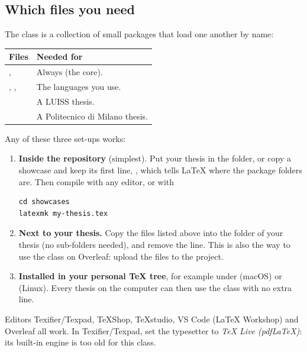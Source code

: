 \documentclass[11pt,a4paper]{article}
\begin{document}
\subsection{Which files you need}

The class is a collection of small packages that load one another by name:

\begin{tabularx}{\textwidth}{@{}l Y@{}}
\toprule
\textbf{Files} & \textbf{Needed for} \\
\midrule
{},  & Always (the core). \\
, ,  & The languages you use. \\
 & A LUISS thesis. \\
 & A Politecnico di Milano thesis. \\
\bottomrule
\end{tabularx}

Any of these three set-ups works:

\begin{enumerate}
  \item \textbf{Inside the repository} (simplest). Put your thesis in the
     folder, or copy a showcase and keep its first line,
    \verb||, which tells \LaTeX{} where the
    package folders are. Then compile with any editor, or with
    \begin{lstlisting}[style=shell]
cd showcases
latexmk my-thesis.tex
    \end{lstlisting}
  \item \textbf{Next to your thesis.} Copy the files listed above into the
    folder of your thesis (no sub-folders needed), and remove the
    \verb|| line. This is also the way to
    use the class on Overleaf: upload the files to the project.
  \item \textbf{Installed in your personal \TeX{} tree}, for example under
     (macOS) or
     (Linux). Every thesis on the
    computer can then use the class with no extra line.
\end{enumerate}

\begin{notebox}{Editors}
Texifier/Texpad, TeXShop, TeXstudio, VS Code (LaTeX Workshop) and Overleaf
all work. In Texifier/Texpad, set the typesetter to \emph{TeX Live
(pdfLaTeX)}: its built-in engine is too old for this class.
\end{notebox}
\end{document}

